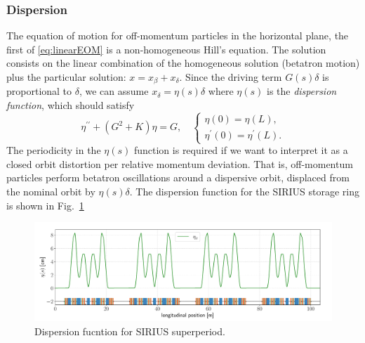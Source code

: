 \subsubsection{Dispersion}
The equation of motion for off-momentum particles in the horizontal plane, the first of \eqref{eq:linearEOM} is a non-homogeneous Hill's equation. The solution consists on the linear combination of the homogeneous solution (betatron motion)  plus the particular solution: $x=x_\beta+ x_\delta$. Since the driving term $G(s)\delta$ is proportional to $\delta$, we can assume  $x_{\delta} = \eta(s)\delta$ where $\eta(s)$ is the \textit{dispersion function}, which should satisfy
    \begin{equation*}
        \eta^{\prime\prime}+(G^2+K)\eta=G,\quad
        \begin{cases}
            \eta(0) = \eta(L),\\
            \eta^\prime(0) = \eta^\prime(L).
        \end{cases}
    \end{equation*}
    The periodicity in the $\eta(s)$ function is required if we want to interpret it as a closed orbit distortion per relative momentum deviation. That is, off-momentum particles perform betatron oscillations around a dispersive orbit, displaced from the nominal orbit by $\eta(s)\delta$. The dispersion function for the SIRIUS storage ring is shown in Fig.~\ref{dispersion_func}
    \begin{figure}[htb]
        \centering
        \includegraphics[width=\textwidth]{Images/dispersion.pdf}
        \caption{Dispersion fucntion for SIRIUS superperiod.}
        \label{dispersion_func}
    \end{figure}
